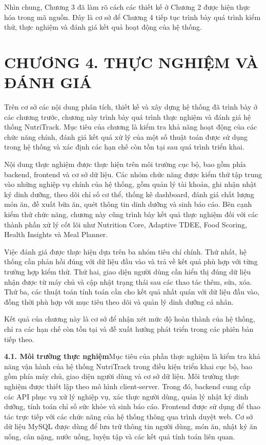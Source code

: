 Nhìn chung, Chương 3 đã làm rõ cách các thiết kế ở Chương 2 được hiện thực hóa trong mã nguồn. Đây là cơ sở để Chương 4 tiếp tục trình bày quá trình kiểm thử, thực nghiệm và đánh giá kết quả hoạt động của hệ thống.




\chapter*{CHƯƠNG 4. THỰC NGHIỆM VÀ ĐÁNH GIÁ}
Trên cơ sở các nội dung phân tích, thiết kế và xây dựng hệ thống đã trình bày ở các chương trước, chương này trình bày quá trình thực nghiệm và đánh giá hệ thống NutriTrack. Mục tiêu của chương là kiểm tra khả năng hoạt động của các chức năng chính, đánh giá kết quả xử lý của một số thuật toán được sử dụng trong hệ thống và xác định các hạn chế còn tồn tại sau quá trình triển khai.

Nội dung thực nghiệm được thực hiện trên môi trường cục bộ, bao gồm phía backend, frontend và cơ sở dữ liệu. Các nhóm chức năng được kiểm thử tập trung vào những nghiệp vụ chính của hệ thống, gồm quản lý tài khoản, ghi nhận nhật ký dinh dưỡng, theo dõi chỉ số cơ thể, thống kê dashboard, đánh giá chất lượng món ăn, đề xuất bữa ăn, quét thông tin dinh dưỡng và sinh báo cáo. Bên cạnh kiểm thử chức năng, chương này cũng trình bày kết quả thực nghiệm đối với các thành phần xử lý cốt lõi như Nutrition Core, Adaptive TDEE, Food Scoring, Health Insights và Meal Planner.

Việc đánh giá được thực hiện dựa trên ba nhóm tiêu chí chính. Thứ nhất, hệ thống cần phản hồi đúng với dữ liệu đầu vào và trả về kết quả phù hợp với từng trường hợp kiểm thử. Thứ hai, giao diện người dùng cần hiển thị đúng dữ liệu nhận được từ máy chủ và cập nhật trạng thái sau các thao tác thêm, sửa, xóa. Thứ ba, các thuật toán tính toán cần cho kết quả nhất quán với dữ liệu đầu vào, đồng thời phù hợp với mục tiêu theo dõi và quản lý dinh dưỡng cá nhân.

Kết quả của chương này là cơ sở để nhận xét mức độ hoàn thành của hệ thống, chỉ ra các hạn chế còn tồn tại và đề xuất hướng phát triển trong các phiên bản tiếp theo.

\textbf{4.1. Môi trường thực nghiệm}Mục tiêu của phần thực nghiệm là kiểm tra khả năng vận hành của hệ thống NutriTrack trong điều kiện triển khai cục bộ, bao gồm phía máy chủ, giao diện người dùng và cơ sở dữ liệu. Môi trường thực nghiệm được thiết lập theo mô hình client-server. Trong đó, backend cung cấp các API phục vụ xử lý nghiệp vụ, xác thực người dùng, quản lý nhật ký dinh dưỡng, tính toán chỉ số sức khỏe và sinh báo cáo. Frontend được sử dụng để thao tác trực tiếp với các chức năng của hệ thống thông qua trình duyệt web. Cơ sở dữ liệu MySQL được dùng để lưu trữ thông tin người dùng, món ăn, nhật ký ăn uống, cân nặng, nước uống, luyện tập và các kết quả tính toán liên quan.

